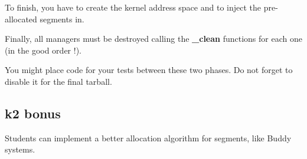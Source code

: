 To finish, you  have to create the kernel address  space and to inject
the pre-allocated segments in.

Finally, all  managers must be destroyed  calling the \textbf{\_clean}
functions for each one (in the good order !).

You might place  code for your tests between these  two phases. Do not
forget to disable it for the final tarball.

%
%

\subsection{k2 bonus}

Students can implement a better allocation algorithm for
segments, like Buddy systems.
